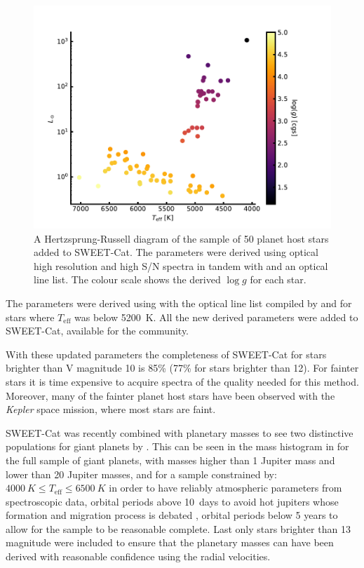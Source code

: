 \begin{figure}[htpb!]
    \centering
    \includegraphics[width=1.0\linewidth]{figures/HR.pdf}
    \caption{A Hertzsprung-Russell diagram of the sample of 50 planet host stars added to SWEET-Cat.
             The parameters were derived using optical high resolution and high S/N spectra in
             tandem with \FASMA and an optical line list. The colour scale shows the derived
             $\log g$ for each star.}
    \label{fig:sweetcat}
\end{figure}

The parameters were derived using \FASMA with the optical line list compiled by \citet{Sousa2008a}
and \citet{Tsantaki2013} for stars where $T_\mathrm{eff}$ was below \SI{5200}{K}. All the new
derived parameters were added to SWEET-Cat, available for the community.

With these updated parameters the completeness of SWEET-Cat for stars brighter than V magnitude 10
is 85\% (77\% for stars brighter than 12). For fainter stars it is time expensive to acquire spectra
of the quality needed for this method. Moreover, many of the fainter planet host stars have been
observed with the \emph{Kepler} space mission, where most stars are faint.

SWEET-Cat was recently combined with planetary masses to see two distinctive populations for giant
planets by \citet{Santos2017}. This can be seen in the mass histogram in 
for the full sample of giant planets, with masses higher than 1 Jupiter mass and lower than 20
Jupiter masses, and for a sample constrained by: $\SI{4000}{K}\leq T_\mathrm{eff} \leq\SI{6500}{K}$
in order to have reliably atmospheric parameters from spectroscopic data, orbital periods above
\SI{10}{days} to avoid hot jupiters whose formation and migration process is debated \citep[see
e.g.]{Ngo2016}, orbital periods below 5 years to allow for the sample to be reasonable complete.
Last only stars brighter than 13 magnitude were included to ensure that the planetary masses can
have been derived with reasonable confidence using the radial velocities.

